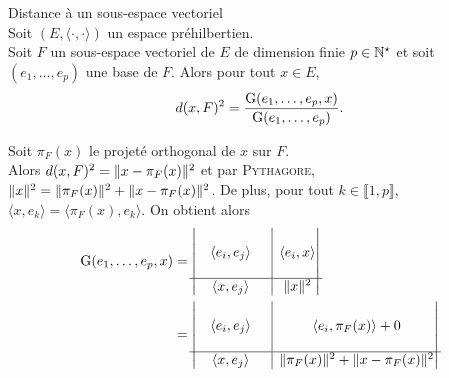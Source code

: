 \begin{theo} \label{distance_a_un_sous_espace_vectoriel}
    Distance à un sous-espace vectoriel \\
    Soit $(E, \langle \cdot , \cdot \rangle)$ un espace préhilbertien. \\
    Soit $F$ un sous-espace vectoriel de $E$ de dimension finie $p \in \mathbb{N}^\star$ et soit $(e_1, \dots, e_p)$ une base de $F$. Alors pour tout $x \in E$,
    $$d(x, F)^2 = \frac{\mathrm{G}(e_1, \dots, e_p, x)}{\mathrm{G}(e_1, \dots, e_p)}.$$
\end{theo}

\begin{preuve}
    Soit $\pi_F(x)$ le projeté orthogonal de $x$ sur $F$. \\
    Alors $d(x, F)^2 = \Vert x - \pi_F(x) \Vert^2$ et par \textsc{Pythagore}, $\Vert x \Vert^2 = \Vert \pi_F(x) \Vert^2 + \Vert x - \pi_F(x) \Vert^2$. De plus, pour tout $k \in \llbracket 1, p \rrbracket$, $\langle x , e_k \rangle = \langle \pi_F(x) , e_k \rangle$. On obtient alors
    \begin{align*}
        \Gram(e_1, \dots, e_p, x) &= 
        \begin{vmatrix}
          \begin{matrix}
            & & \\
            & \langle e_i, e_j \rangle & \\
            & &
          \end{matrix}
          & \rvline & \langle e_i, x \rangle \\
        \hline
          \langle x, e_j \rangle & \rvline &
          \begin{matrix}
          \norme{x}^2
          \end{matrix}
        \end{vmatrix} \\
        &=
        \begin{vmatrix}
          \begin{matrix}
            & & \\
            & \langle e_i, e_j \rangle & \\
            & &
          \end{matrix}
          & \rvline & \langle e_i, \pi_F(x) \rangle + 0 \\
        \hline
          \langle x, e_j \rangle & \rvline &
          \begin{matrix}
          \norme{\pi_F(x)}^2 + \norme{x - \pi_F(x)}^2
          \end{matrix}
        \end{vmatrix} 

\end{align*}
\end{preuve}
